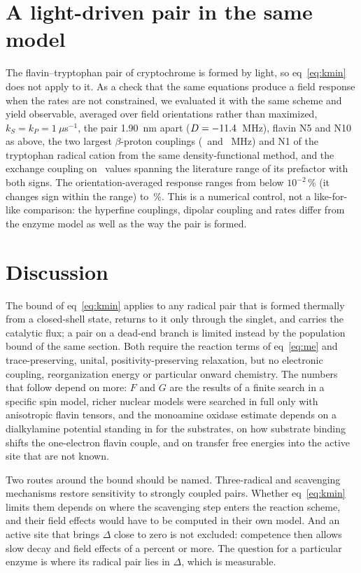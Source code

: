 \documentclass[aip,jcp,amsmath,amssymb,reprint]{revtex4-1}
\begin{document}
\section{A light-driven pair in the same model}

The flavin--tryptophan pair of cryptochrome is formed by light,\cite{Ritz2000,Maeda2012} so
eq~\ref{eq:kmin} does not apply to it. As a check that the same equations
produce a field response when the rates are not constrained, we evaluated it
with the same scheme and yield observable, averaged over field orientations
rather than maximized, $k_S = k_P = 1~\mu$s$^{-1}$, the pair
1.90~nm apart ($D = -11.4$~MHz), flavin N5 and N10 as above, the two largest
$\beta$-proton couplings (\aTrpOne\ and \aTrpTwo~MHz) and N1 of the tryptophan
radical cation from the same density-functional method, and the exchange
coupling on \nCry\ values spanning the literature range of its prefactor with
both signs.\cite{Efimova2008} The orientation-averaged response ranges from
below $10^{-2}$\,\% (it changes sign within the range) to \cryMax\,\%. This is
a numerical control, not a like-for-like comparison: the hyperfine couplings,
dipolar coupling and rates differ from the enzyme model as well as the way the
pair is formed.

\section{Discussion}

The bound of eq~\ref{eq:kmin} applies to any radical pair that is formed
thermally from a closed-shell state, returns to it only through the singlet,
and carries the catalytic flux; a pair on a dead-end branch is limited instead
by the population bound of the same section. Both require the reaction terms of
eq~\ref{eq:me} and trace-preserving, unital, positivity-preserving relaxation, but no electronic
coupling, reorganization energy or particular onward chemistry. The numbers that
follow depend on more: $F$ and $G$ are the results of a finite search in a
specific spin model, richer nuclear models were searched in full only with
anisotropic flavin tensors, and the monoamine oxidase estimate depends on a dialkylamine potential
standing in for the substrates, on how substrate binding shifts the
one-electron flavin couple, and on transfer free energies into the active site
that are not known.

Two routes around the bound should be named. Three-radical and scavenging
mechanisms\cite{Kattnig2017} restore sensitivity to strongly coupled pairs.
Whether eq~\ref{eq:kmin} limits them depends on where the scavenging step enters
the reaction scheme, and their field effects would have to be computed in their
own model. And an active site that brings $\Delta$ close to zero is not
excluded: competence then allows slow decay and field effects of a percent or
more. The question for a particular enzyme is where its radical pair lies in
$\Delta$, which is measurable.
\end{document}
